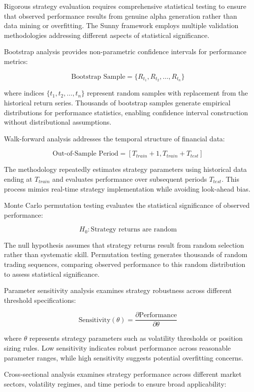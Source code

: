 \documentclass[
  american,
  11pt,
  11pt,
  letterpaper,
  onecolumn]{article}
\begin{document}
Rigorous strategy evaluation requires comprehensive statistical testing
to ensure that observed performance results from genuine alpha
generation rather than data mining or overfitting. The Sunny framework
employs multiple validation methodologies addressing different aspects
of statistical significance.

Bootstrap analysis provides non-parametric confidence intervals for
performance metrics:

\[\text{Bootstrap Sample} = \{R_{t_1}, R_{t_2}, \ldots, R_{t_n}\}\]

where indices \(\{t_1, t_2, \ldots, t_n\}\) represent random samples
with replacement from the historical return series. Thousands of
bootstrap samples generate empirical distributions for performance
statistics, enabling confidence interval construction without
distributional assumptions.

Walk-forward analysis addresses the temporal structure of financial
data:

\[\text{Out-of-Sample Period} = [T_{train} + 1, T_{train} + T_{test}]\]

The methodology repeatedly estimates strategy parameters using
historical data ending at \(T_{train}\) and evaluates performance over
subsequent periods \(T_{test}\). This process mimics real-time strategy
implementation while avoiding look-ahead bias.

Monte Carlo permutation testing evaluates the statistical significance
of observed performance:

\[H_0: \text{Strategy returns are random}\]

The null hypothesis assumes that strategy returns result from random
selection rather than systematic skill. Permutation testing generates
thousands of random trading sequences, comparing observed performance to
this random distribution to assess statistical significance.

Parameter sensitivity analysis examines strategy robustness across
different threshold specifications:

\[\text{Sensitivity}(\theta) = \frac{\partial \text{Performance}}{\partial \theta}\]

where \(\theta\) represents strategy parameters such as volatility
thresholds or position sizing rules. Low sensitivity indicates robust
performance across reasonable parameter ranges, while high sensitivity
suggests potential overfitting concerns.

Cross-sectional analysis examines strategy performance across different
market sectors, volatility regimes, and time periods to ensure broad
applicability:
\end{document}
